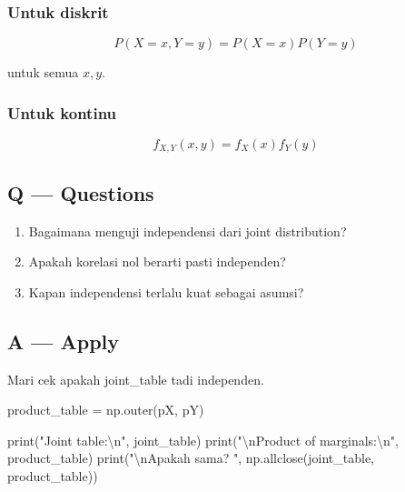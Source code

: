 \documentclass[
  letterpaper,
  DIV=11,
  numbers=noendperiod]{scrreprt}
\newenvironment{Shaded}{\begin{snugshade}}{\end{snugshade}}
\newcommand{\BuiltInTok}[1]{\textcolor[rgb]{0.00,0.23,0.31}{#1}}
\newcommand{\CharTok}[1]{\textcolor[rgb]{0.13,0.47,0.30}{#1}}
\newcommand{\NormalTok}[1]{\textcolor[rgb]{0.00,0.23,0.31}{#1}}
\newcommand{\OperatorTok}[1]{\textcolor[rgb]{0.37,0.37,0.37}{#1}}
\newcommand{\StringTok}[1]{\textcolor[rgb]{0.13,0.47,0.30}{#1}}
\providecommand{\tightlist}{%
  \setlength{\itemsep}{0pt}\setlength{\parskip}{0pt}}
\begin{document}
\subsubsection{Untuk diskrit}\label{untuk-diskrit-4}

\[
P(X=x, Y=y)=P(X=x)P(Y=y)
\]

untuk semua \(x,y\).

\subsubsection{Untuk kontinu}\label{untuk-kontinu-2}

\[
f_{X,Y}(x,y)=f_X(x)f_Y(y)
\]

\subsection{Q --- Questions}\label{q-questions-34}

\begin{enumerate}
\def\labelenumi{\arabic{enumi}.}
\tightlist
\item
  Bagaimana menguji independensi dari joint distribution?
\item
  Apakah korelasi nol berarti pasti independen?
\item
  Kapan independensi terlalu kuat sebagai asumsi?
\end{enumerate}

\subsection{A --- Apply}\label{a-apply-33}

Mari cek apakah joint\_table tadi independen.

\begin{Shaded}
\begin{Highlighting}[]
\NormalTok{product\_table }\OperatorTok{=}\NormalTok{ np.outer(pX, pY)}

\BuiltInTok{print}\NormalTok{(}\StringTok{"Joint table:}\CharTok{\textbackslash{}n}\StringTok{"}\NormalTok{, joint\_table)}
\BuiltInTok{print}\NormalTok{(}\StringTok{"}\CharTok{\textbackslash{}n}\StringTok{Product of marginals:}\CharTok{\textbackslash{}n}\StringTok{"}\NormalTok{, product\_table)}
\BuiltInTok{print}\NormalTok{(}\StringTok{"}\CharTok{\textbackslash{}n}\StringTok{Apakah sama? "}\NormalTok{, np.allclose(joint\_table, product\_table))}
\end{Highlighting}
\end{Shaded}
\end{document}
